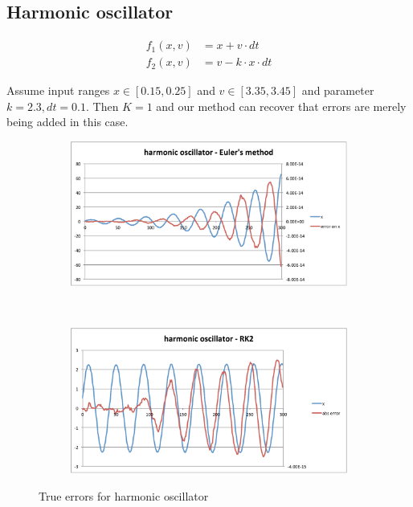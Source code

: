 \documentclass[10pt]{article}
\newcommand{\eqn}[1]{
 \begin{align} #1
 \end{align}}
\begin{document}
\subsection{Harmonic oscillator}
\eqn{
  f_1(x, v) &= x + v \cdot dt\\
  f_2(x, v) &= v - k \cdot x \cdot dt
}

Assume input ranges $x \in [0.15, 0.25]$ and $v \in [3.35, 3.45]$
and parameter $k = 2.3, dt = 0.1$.
Then $K = 1$ and our method can recover that errors are merely being added in this case.


\begin{figure}[h!]
  \centering
\begin{subfigure}[b]{0.45\textwidth}
\includegraphics[width=\textwidth]{images/harmonic_euler}
\end{subfigure}%
~ %
\begin{subfigure}[b]{0.45\textwidth}
\includegraphics[width=\textwidth]{images/harmonic_rk2}
\end{subfigure}
\caption{True errors for harmonic oscillator}
\label{fig:harmonic}
\end{figure}
\end{document}
